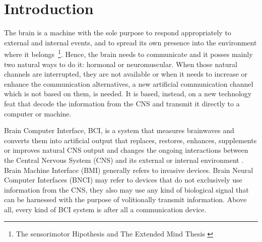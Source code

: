 \chapter{Introduction}



The brain is a machine with the sole purpose to respond appropriately to external and internal events, and to spread its own presence into the environment where it belongs~\footnote{The sensorimotor Hipothesis \cite{young1970,WolpawJonathanR2012} and The Extended Mind Thesis \cite{clark2008}}.  Hence, the brain needs to communicate and it posses mainly two natural ways to do it: hormonal or neuromuscular.  When those natural channels are interrupted, they are not available or when it needs to increase or enhance the communication alternatives, a new artificial communication channel which is not based on them, is needed. It is based, instead, on a new technology feat that decode the information from the CNS and transmit it directly to a computer or machine.

Brain Computer Interface, BCI, is a system that measures brainwaves and converts them into artificial output that replaces, restores, enhances, supplements or improves natural CNS output and changes the ongoing interactions between the Central Nervous System (CNS) and its external or internal environment \cite{WolpawJonathanR2012}. Brain Machine Interface (BMI) generally refers to invasive devices. Brain Neural Computer Interfaces (BNCI) may refer to devices that do not exclusively use information from the CNS, they also may use any kind of biological signal that can be harnessed with the purpose of volitionally transmit information. Above all, every kind of BCI system is after all a communication device.

